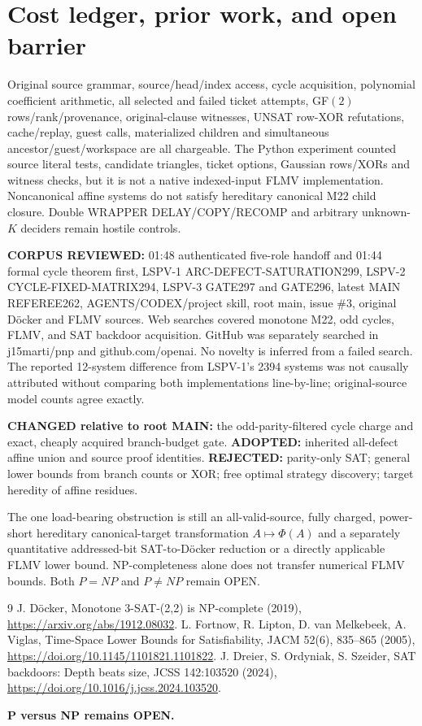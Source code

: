 \documentclass[11pt]{article}
\begin{document}
\section{Cost ledger, prior work, and open barrier}
Original source grammar, source/head/index access, cycle acquisition, polynomial coefficient arithmetic, all selected and failed ticket attempts, GF$(2)$ rows/rank/provenance, original-clause witnesses, UNSAT row-XOR refutations, cache/replay, guest calls, materialized children and simultaneous ancestor/guest/workspace are all chargeable. The Python experiment counted source literal tests, candidate triangles, ticket options, Gaussian rows/XORs and witness checks, but it is not a native indexed-input FLMV implementation. Noncanonical affine systems do not satisfy hereditary canonical M22 child closure. Double WRAPPER DELAY/COPY/RECOMP and arbitrary unknown-$K$ deciders remain hostile controls.
\par\noindent\textbf{CORPUS REVIEWED:} 01:48 authenticated five-role handoff and 01:44 formal cycle theorem first, LSPV-1 ARC-DEFECT-SATURATION299, LSPV-2 CYCLE-FIXED-MATRIX294, LSPV-3 GATE297 and GATE296, latest MAIN REFEREE262, AGENTS/CODEX/project skill, root main, issue \#3, original D\"ocker and FLMV sources. Web searches covered monotone M22, odd cycles, FLMV, and SAT backdoor acquisition. GitHub was separately searched in j15marti/pnp and github.com/openai. No novelty is inferred from a failed search. The reported 12-system difference from LSPV-1's 2394 systems was not causally attributed without comparing both implementations line-by-line; original-source model counts agree exactly.
\par\noindent\textbf{CHANGED relative to root MAIN:} the odd-parity-filtered cycle charge and exact, cheaply acquired branch-budget gate. \textbf{ADOPTED:} inherited all-defect affine union and source proof identities. \textbf{REJECTED:} parity-only SAT; general lower bounds from branch counts or XOR; free optimal strategy discovery; target heredity of affine residues.
\par\noindent The one load-bearing obstruction is still an all-valid-source, fully charged, power-short hereditary canonical-target transformation $A\mapsto\Phi(A)$ and a separately quantitative addressed-bit SAT-to-D\"ocker reduction or a directly applicable FLMV lower bound. NP-completeness alone does not transfer numerical FLMV bounds. Both $P=NP$ and $P\ne NP$ remain OPEN.
\begin{thebibliography}{9}
 J. D\"ocker, Monotone 3-SAT-(2,2) is NP-complete (2019), \url{https://arxiv.org/abs/1912.08032}.
 L. Fortnow, R. Lipton, D. van Melkebeek, A. Viglas, Time-Space Lower Bounds for Satisfiability, JACM 52(6), 835--865 (2005), \url{https://doi.org/10.1145/1101821.1101822}.
 J. Dreier, S. Ordyniak, S. Szeider, SAT backdoors: Depth beats size, JCSS 142:103520 (2024), \url{https://doi.org/10.1016/j.jcss.2024.103520}.
\end{thebibliography}
\noindent\textbf{P versus NP remains OPEN.}
\end{document}
